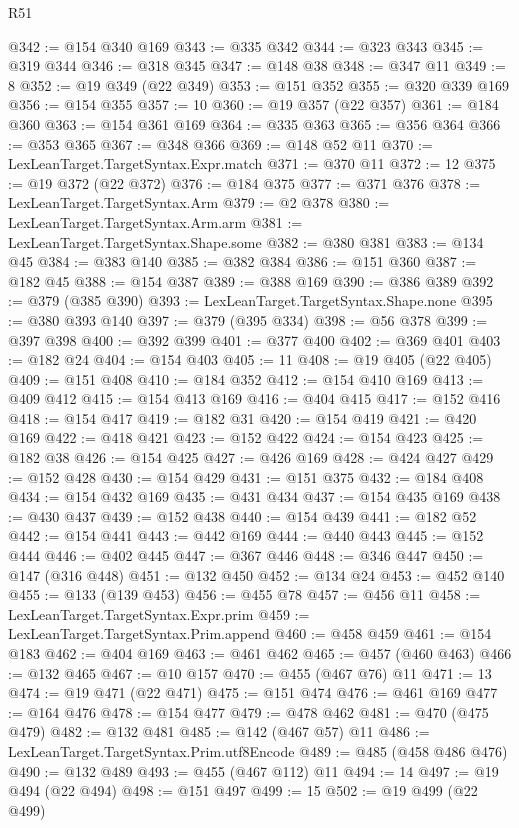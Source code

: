 \begin{lexlean}{R51}
\begin{coremodule}
@342 := @154 @340 @169
@343 := @335 @342
@344 := @323 @343
@345 := @319 @344
@346 := @318 @345
@347 := @148 @38
@348 := @347 @11
@349 := 8
@352 := @19 @349 (@22 @349)
@353 := @151 @352
@355 := @320 @339 @169
@356 := @154 @355
@357 := 10
@360 := @19 @357 (@22 @357)
@361 := @184 @360
@363 := @154 @361 @169
@364 := @335 @363
@365 := @356 @364
@366 := @353 @365
@367 := @348 @366
@369 := @148 @52 @11
@370 := LexLeanTarget.TargetSyntax.Expr.match
@371 := @370 @11
@372 := 12
@375 := @19 @372 (@22 @372)
@376 := @184 @375
@377 := @371 @376
@378 := LexLeanTarget.TargetSyntax.Arm
@379 := @2 @378
@380 := LexLeanTarget.TargetSyntax.Arm.arm
@381 := LexLeanTarget.TargetSyntax.Shape.some
@382 := @380 @381
@383 := @134 @45
@384 := @383 @140
@385 := @382 @384
@386 := @151 @360
@387 := @182 @45
@388 := @154 @387
@389 := @388 @169
@390 := @386 @389
@392 := @379 (@385 @390)
@393 := LexLeanTarget.TargetSyntax.Shape.none
@395 := @380 @393 @140
@397 := @379 (@395 @334)
@398 := @56 @378
@399 := @397 @398
@400 := @392 @399
@401 := @377 @400
@402 := @369 @401
@403 := @182 @24
@404 := @154 @403
@405 := 11
@408 := @19 @405 (@22 @405)
@409 := @151 @408
@410 := @184 @352
@412 := @154 @410 @169
@413 := @409 @412
@415 := @154 @413 @169
@416 := @404 @415
@417 := @152 @416
@418 := @154 @417
@419 := @182 @31
@420 := @154 @419
@421 := @420 @169
@422 := @418 @421
@423 := @152 @422
@424 := @154 @423
@425 := @182 @38
@426 := @154 @425
@427 := @426 @169
@428 := @424 @427
@429 := @152 @428
@430 := @154 @429
@431 := @151 @375
@432 := @184 @408
@434 := @154 @432 @169
@435 := @431 @434
@437 := @154 @435 @169
@438 := @430 @437
@439 := @152 @438
@440 := @154 @439
@441 := @182 @52
@442 := @154 @441
@443 := @442 @169
@444 := @440 @443
@445 := @152 @444
@446 := @402 @445
@447 := @367 @446
@448 := @346 @447
@450 := @147 (@316 @448)
@451 := @132 @450
@452 := @134 @24
@453 := @452 @140
@455 := @133 (@139 @453)
@456 := @455 @78
@457 := @456 @11
@458 := LexLeanTarget.TargetSyntax.Expr.prim
@459 := LexLeanTarget.TargetSyntax.Prim.append
@460 := @458 @459
@461 := @154 @183
@462 := @404 @169
@463 := @461 @462
@465 := @457 (@460 @463)
@466 := @132 @465
@467 := @10 @157
@470 := @455 (@467 @76) @11
@471 := 13
@474 := @19 @471 (@22 @471)
@475 := @151 @474
@476 := @461 @169
@477 := @164 @476
@478 := @154 @477
@479 := @478 @462
@481 := @470 (@475 @479)
@482 := @132 @481
@485 := @142 (@467 @57) @11
@486 := LexLeanTarget.TargetSyntax.Prim.utf8Encode
@489 := @485 (@458 @486 @476)
@490 := @132 @489
@493 := @455 (@467 @112) @11
@494 := 14
@497 := @19 @494 (@22 @494)
@498 := @151 @497
@499 := 15
@502 := @19 @499 (@22 @499)

\end{coremodule}
\end{lexlean}
